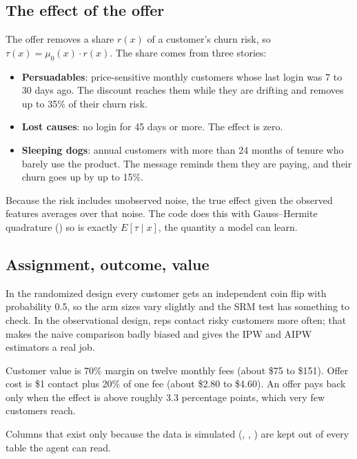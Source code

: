 \documentclass[11pt]{article}
\begin{document}

\subsection{The effect of the offer}
The offer removes a share $r(x)$ of a customer's churn risk, so $\tau(x) = \mu_0(x) \cdot r(x)$. The share comes from three stories:


\begin{itemize}
\item \textbf{Persuadables}: price-sensitive monthly customers whose last login was 7 to 30 days ago. The discount reaches them while they are drifting and removes up to 35\% of their churn risk.
\item \textbf{Lost causes}: no login for 45 days or more. The effect is zero.
\item \textbf{Sleeping dogs}: annual customers with more than 24 months of tenure who barely use the product. The message reminds them they are paying, and their churn goes up by up to 15\%.
\end{itemize}

Because the risk includes unobserved noise, the true effect given the observed features averages over that noise. The code does this with Gauss--Hermite quadrature () so  is exactly $E[\tau \mid x]$, the quantity a model can learn.

\subsection{Assignment, outcome, value}

In the randomized design every customer gets an independent coin flip with probability 0.5, so the arm sizes vary slightly and the SRM test has something to check. In the observational design, reps contact risky customers more often; that makes the naive comparison badly biased and gives the IPW and AIPW estimators a real job.

Customer value is 70\% margin on twelve monthly fees (about \$75 to \$151). Offer cost is \$1 contact plus 20\% of one fee (about \$2.80 to \$4.60). An offer pays back only when the effect is above roughly 3.3 percentage points, which very few customers reach.

Columns that exist only because the data is simulated (, , ) are kept out of every table the agent can read.
\end{document}
